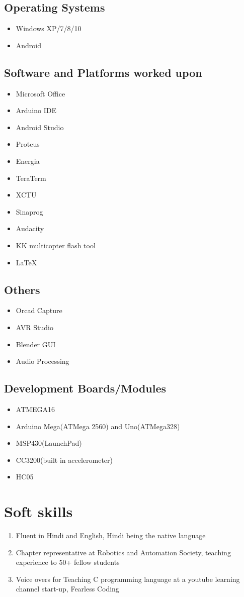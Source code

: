 \documentclass[11pt]{article}
\begin{document}
\begin{minipage}{0.80\linewidth}
\subsection{Operating Systems}
\begin{itemize}
\item Windows XP/7/8/10
\item Android
\end{itemize}
\subsection{Software and Platforms worked upon}
\begin{itemize}
\item Microsoft Office
\item Arduino IDE
\item Android Studio
\item Proteus
\item Energia
\item TeraTerm
\item XCTU
\item Sinaprog
\item Audacity
\item KK multicopter flash tool
\item LaTeX
\end{itemize}
\subsection{Others}
\begin{itemize}
\item Orcad Capture
\item AVR Studio
\item Blender GUI
\item Audio Processing
\end{itemize}
\subsection{Development Boards/Modules}
\begin{itemize}
\item ATMEGA16
\item Arduino Mega(ATMega 2560) and Uno(ATMega328)
\item MSP430(LaunchPad)
\item CC3200(built in accelerometer)
\item HC05
\end{itemize}
\section{\color{orange}Sof\color{black}t skills}
\begin{enumerate}
\item Fluent in Hindi and English, Hindi being the native language
\item Chapter representative at Robotics and Automation Society, teaching experience to 50+ fellow students
\item Voice overs for Teaching C programming language at a youtube learning channel start-up, Fearless Coding
\end{enumerate}
\end{minipage}
\end{document}
